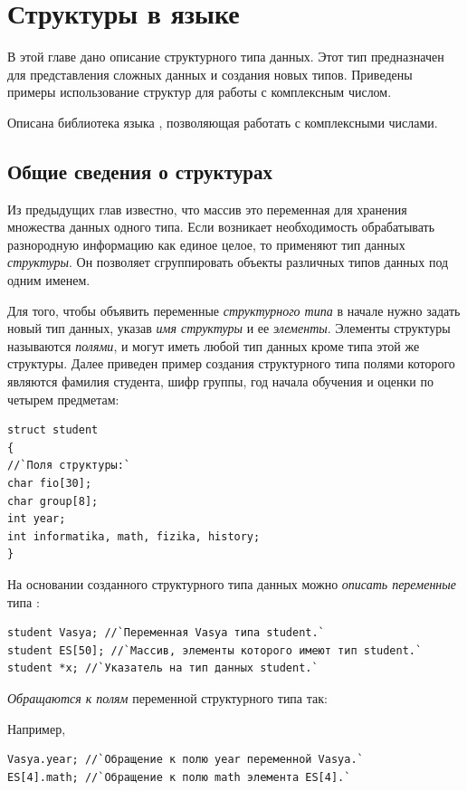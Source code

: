 \chapter[Структуры в языке \Sys{C++}]{Структуры в языке }\label{ch09}
В этой главе дано описание структурного типа данных. Этот тип предназначен для представления сложных данных и создания
новых типов. Приведены примеры использование структур для работы с комплексным числом.

Описана библиотека языка , позволяющая работать с комплексными числами.

\section[Общие сведения о структурах]{Общие сведения о структурах}
Из предыдущих глав известно, что массив это переменная для хранения множества данных одного типа. Если возникает
необходимость обрабатывать  разнородную информацию как единое целое, то применяют тип данных
\emph{структуры}. Он позволяет сгруппировать объекты различных типов данных под одним
именем.

Для того, чтобы объявить переменные \emph{структурного типа} в начале нужно задать новый тип данных, указав
\emph{имя структуры} и ее \emph{элементы}. Элементы структуры называются
\emph{полями}, и могут иметь любой тип данных кроме типа этой же структуры. Далее приведен пример создания
структурного типа  полями которого являются фамилия студента, шифр группы, год начала
обучения и оценки по четырем предметам:

\begin{lstlisting}
struct student
{
//`Поля структуры:`
char fio[30];
char group[8];
int year; 
int informatika, math, fizika, history;
}
\end{lstlisting}

На основании созданного структурного типа данных можно \emph{описать переменные}  типа
:

\begin{lstlisting}
student Vasya; //`Переменная Vasya типа student.`
student ES[50]; //`Массив, элементы которого имеют тип student.`
student *x; //`Указатель на тип данных student.`
\end{lstlisting}

\emph{Обращаются к полям} переменной структурного типа так: 


Например, 
\begin{lstlisting}
Vasya.year; //`Обращение к полю year переменной Vasya.`
ES[4].math; //`Обращение к полю math элемента ES[4].`
\end{lstlisting}

